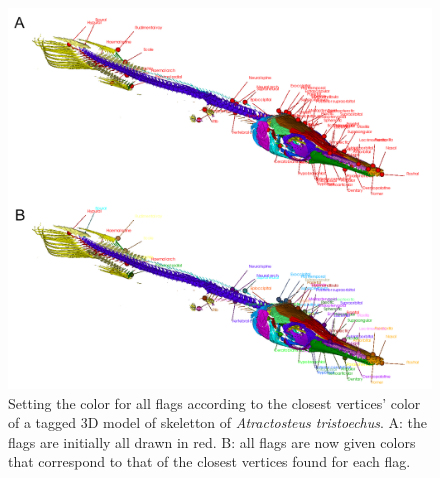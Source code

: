 \begin{figure}
  \centering
  \includegraphics[scale=0.31]{images/10/edit_flag_color_closest_vertex.png} 
	\caption{Setting the color for all flags according to the closest vertices' color of a tagged 3D model of skeletton of \textit{Atractosteus tristoechus}. A: the flags are initially all  drawn in red. B: all flags are now given colors that correspond to that of the closest vertices found for each flag.}
\label{flag_color_closest_vertex}
\end{figure}
